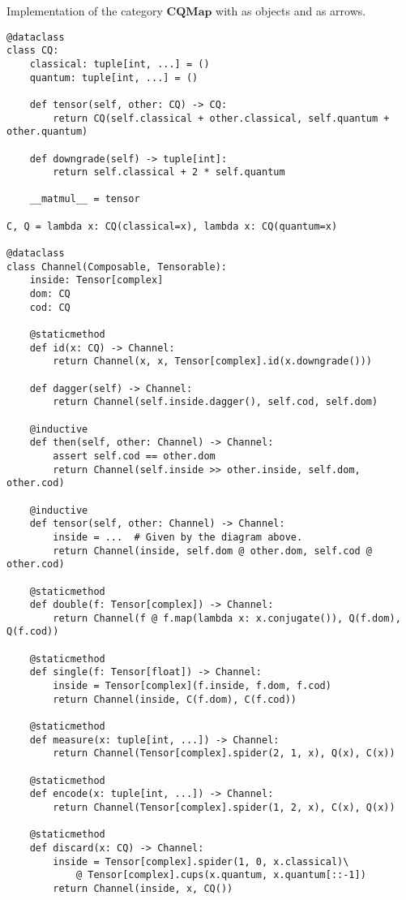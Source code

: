 \begin{python}
{\normalfont Implementation of the category $\mathbf{CQMap}$ with  as objects and  as arrows.}

\begin{verbatim}
@dataclass
class CQ:
    classical: tuple[int, ...] = ()
    quantum: tuple[int, ...] = ()

    def tensor(self, other: CQ) -> CQ:
        return CQ(self.classical + other.classical, self.quantum + other.quantum)

    def downgrade(self) -> tuple[int]:
        return self.classical + 2 * self.quantum

    __matmul__ = tensor

C, Q = lambda x: CQ(classical=x), lambda x: CQ(quantum=x)

@dataclass
class Channel(Composable, Tensorable):
    inside: Tensor[complex]
    dom: CQ
    cod: CQ

    @staticmethod
    def id(x: CQ) -> Channel:
        return Channel(x, x, Tensor[complex].id(x.downgrade()))

    def dagger(self) -> Channel:
        return Channel(self.inside.dagger(), self.cod, self.dom)

    @inductive
    def then(self, other: Channel) -> Channel:
        assert self.cod == other.dom
        return Channel(self.inside >> other.inside, self.dom, other.cod)

    @inductive
    def tensor(self, other: Channel) -> Channel:
        inside = ...  # Given by the diagram above.
        return Channel(inside, self.dom @ other.dom, self.cod @ other.cod)

    @staticmethod
    def double(f: Tensor[complex]) -> Channel:
        return Channel(f @ f.map(lambda x: x.conjugate()), Q(f.dom), Q(f.cod))

    @staticmethod
    def single(f: Tensor[float]) -> Channel:
        inside = Tensor[complex](f.inside, f.dom, f.cod)
        return Channel(inside, C(f.dom), C(f.cod))

    @staticmethod
    def measure(x: tuple[int, ...]) -> Channel:
        return Channel(Tensor[complex].spider(2, 1, x), Q(x), C(x))

    @staticmethod
    def encode(x: tuple[int, ...]) -> Channel:
        return Channel(Tensor[complex].spider(1, 2, x), C(x), Q(x))

    @staticmethod
    def discard(x: CQ) -> Channel:
        inside = Tensor[complex].spider(1, 0, x.classical)\
            @ Tensor[complex].cups(x.quantum, x.quantum[::-1])
        return Channel(inside, x, CQ())
\end{verbatim}
\end{python}

